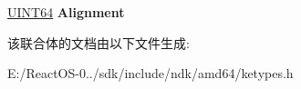 \begin{DoxyCompactItemize}
\begin{tabbing}
\end{tabbing}\item 
\mbox{\label{union___k_g_d_t_e_n_t_r_y64_aece9bc9a2c236fb67991fa4103380c94}} 
\hyperlink{_processor_bind_8h_a57be03562867144161c1bfee95ca8f7c}{U\+I\+N\+T64} {\bfseries Alignment}
\end{DoxyCompactItemize}


该联合体的文档由以下文件生成\+:\begin{DoxyCompactItemize}
\item 
E\+:/\+React\+O\+S-\/0../sdk/include/ndk/amd64/ketypes.\+h\end{DoxyCompactItemize}
